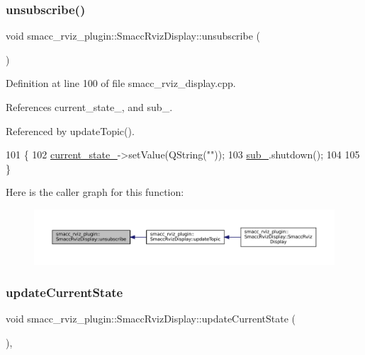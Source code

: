 \subsubsection{\texorpdfstring{unsubscribe()}{unsubscribe()}}
{\footnotesize\ttfamily void smacc\+\_\+rviz\+\_\+plugin\+::\+Smacc\+Rviz\+Display\+::unsubscribe (\begin{DoxyParamCaption}{ }\end{DoxyParamCaption})\hspace{0.3cm}{\ttfamily [virtual]}}



Definition at line 100 of file smacc\+\_\+rviz\+\_\+display.\+cpp.



References current\+\_\+state\+\_\+, and sub\+\_\+.



Referenced by update\+Topic().


\begin{DoxyCode}
101   \{
102     \hyperlink{classsmacc__rviz__plugin_1_1SmaccRvizDisplay_a342ff238c1dfaa427f09ee205a9e92d5}{current\_state\_}->setValue(QString(\textcolor{stringliteral}{""}));
103     \hyperlink{classsmacc__rviz__plugin_1_1SmaccRvizDisplay_abae6e8df8428a072d1de2c59dd4f9cd4}{sub\_}.shutdown();
104 
105   \}
\end{DoxyCode}
Here is the caller graph for this function\+:
\nopagebreak
\begin{figure}[H]
\begin{center}
\leavevmode
\includegraphics[width=350pt]{classsmacc__rviz__plugin_1_1SmaccRvizDisplay_a49a35acd10a664a8335ef5852f8c115c_icgraph}
\end{center}
\end{figure}
\mbox{\label{classsmacc__rviz__plugin_1_1SmaccRvizDisplay_a6031090e46077a5e95754b5f70ea639a}} 
\subsubsection{\texorpdfstring{update\+Current\+State}{updateCurrentState}}
{\footnotesize\ttfamily void smacc\+\_\+rviz\+\_\+plugin\+::\+Smacc\+Rviz\+Display\+::update\+Current\+State (\begin{DoxyParamCaption}{ }\end{DoxyParamCaption})\hspace{0.3cm}{\ttfamily [private]}, {\ttfamily [slot]}}



